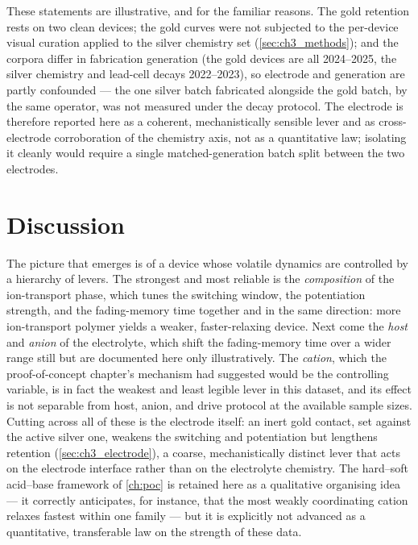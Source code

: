 \documentclass[12pt, twoside]{report}
\begin{document}
These statements are illustrative, and for the familiar reasons. The gold retention rests on two clean devices; the gold curves were not subjected to the per-device visual curation applied to the silver chemistry set (\cref{sec:ch3_methods}); and the corpora differ in fabrication generation (the gold devices are all 2024--2025, the silver chemistry and lead-cell decays 2022--2023), so electrode and generation are partly confounded --- the one silver batch fabricated alongside the gold batch, by the same operator, was not measured under the decay protocol. The electrode is therefore reported here as a coherent, mechanistically sensible lever and as cross-electrode corroboration of the chemistry axis, not as a quantitative law; isolating it cleanly would require a single matched-generation batch split between the two electrodes.

\section{Discussion}\label{sec:ch3_discussion}

The picture that emerges is of a device whose volatile dynamics are controlled by a hierarchy of levers. The strongest and most reliable is the \emph{composition} of the ion-transport phase, which tunes the switching window, the potentiation strength, and the fading-memory time together and in the same direction: more ion-transport polymer yields a weaker, faster-relaxing device. Next come the \emph{host} and \emph{anion} of the electrolyte, which shift the fading-memory time over a wider range still but are documented here only illustratively. The \emph{cation}, which the proof-of-concept chapter's mechanism had suggested would be the controlling variable, is in fact the weakest and least legible lever in this dataset, and its effect is not separable from host, anion, and drive protocol at the available sample sizes. Cutting across all of these is the electrode itself: an inert gold contact, set against the active silver one, weakens the switching and potentiation but lengthens retention (\cref{sec:ch3_electrode}), a coarse, mechanistically distinct lever that acts on the electrode interface rather than on the electrolyte chemistry. The hard--soft acid--base framework of \cref{ch:poc} is retained here as a qualitative organising idea --- it correctly anticipates, for instance, that the most weakly coordinating cation relaxes fastest within one family --- but it is explicitly not advanced as a quantitative, transferable law on the strength of these data.
\end{document}
